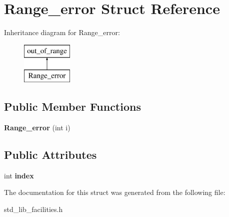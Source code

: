 \hypertarget{struct_range__error}{\section{Range\-\_\-error Struct Reference}
\label{struct_range__error}
}
Inheritance diagram for Range\-\_\-error\-:\begin{figure}[H]
\begin{center}
\leavevmode
\includegraphics[height=2.000000cm]{struct_range__error}
\end{center}
\end{figure}
\subsection*{Public Member Functions}
\begin{DoxyCompactItemize}
\item 
\hypertarget{struct_range__error_a510e1669d70fdc937ca023dc7423ae45}{{\bfseries Range\-\_\-error} (int i)}\label{struct_range__error_a510e1669d70fdc937ca023dc7423ae45}

\end{DoxyCompactItemize}
\subsection*{Public Attributes}
\begin{DoxyCompactItemize}
\item 
\hypertarget{struct_range__error_aca454a3a47f7845ce79dbf8d4393aeb0}{int {\bfseries index}}\label{struct_range__error_aca454a3a47f7845ce79dbf8d4393aeb0}

\end{DoxyCompactItemize}


The documentation for this struct was generated from the following file\-:\begin{DoxyCompactItemize}
\item 
std\-\_\-lib\-\_\-facilities.\-h\end{DoxyCompactItemize}

